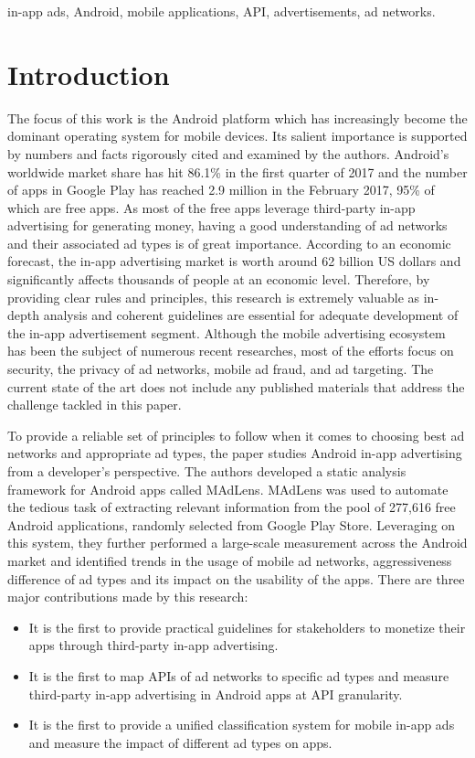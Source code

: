 \documentclass[conference]{IEEEtran}
\begin{document}
\begin{IEEEkeywords}
in-app ads, Android, mobile applications, API, advertisements, ad networks.
\end{IEEEkeywords}

\section{Introduction}
\label{SectionOne}
The focus of this work is the Android platform which has increasingly become the dominant operating system for mobile devices. Its salient importance is supported by numbers and facts rigorously cited and examined by the authors. Android’s worldwide market share has hit 86.1\% in the first quarter of 2017 and the number of apps in Google Play has reached 2.9 million in the February 2017, 95\% of which are free apps\cite{Gartner}. As most of the free apps leverage third-party in-app advertising for generating money, having a good understanding of ad networks and their associated ad types is of great importance. According to an economic forecast\cite{Visionmobile}, the in-app advertising market is worth around 62 billion US dollars and significantly affects thousands of people at an economic level. Therefore, by providing clear rules and principles, this research is extremely valuable as in-depth analysis and coherent guidelines are essential for adequate development of the in-app advertisement segment. Although the mobile advertising ecosystem has been the subject of numerous recent researches, most of the efforts focus on security, the privacy of ad networks, mobile ad fraud, and ad targeting. The current state of the art does not include any published materials that address the challenge tackled in this paper.


To provide a reliable set of principles to follow when it comes to choosing best ad networks and appropriate ad types, the paper studies Android in-app advertising from a developer’s perspective. The authors developed a static analysis framework for Android apps called MAdLens. MAdLens was used to automate the tedious task of extracting relevant information from the pool of 277,616 free Android applications, randomly selected from Google Play Store. Leveraging on this system, they further performed a large-scale measurement across the Android market and identified trends in the usage of mobile ad networks, aggressiveness difference of ad types and its impact on the usability of the apps. There are three major contributions made by this research:
\begin{itemize}
\item It is the first to provide practical guidelines for stakeholders to monetize their apps through third-party in-app advertising.
\item It is the first to map APIs of ad networks to specific ad types and measure third-party in-app advertising in Android apps at API granularity.
\item It is the first to provide a unified classification system for mobile in-app ads and measure the impact of different ad types on apps.
\end{itemize}
\end{document}
